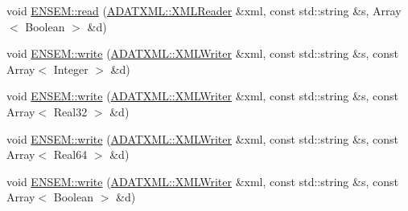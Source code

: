 \begin{DoxyCompactItemize}
\item 
void \mbox{\hyperlink{namespaceENSEM_a13be7bdc8993a65ff255f214db955c16}{E\+N\+S\+E\+M\+::read}} (\mbox{\hyperlink{classADATXML_1_1XMLReader}{A\+D\+A\+T\+X\+M\+L\+::\+X\+M\+L\+Reader}} \&xml, const std\+::string \&s, Array$<$ Boolean $>$ \&d)
\item 
void \mbox{\hyperlink{namespaceENSEM_a1e0e32b9a435ad75c6308eed3fbccdb9}{E\+N\+S\+E\+M\+::write}} (\mbox{\hyperlink{classADATXML_1_1XMLWriter}{A\+D\+A\+T\+X\+M\+L\+::\+X\+M\+L\+Writer}} \&xml, const std\+::string \&s, const Array$<$ Integer $>$ \&d)
\item 
void \mbox{\hyperlink{namespaceENSEM_a5d6d46f2975052a57ae6d284798b574a}{E\+N\+S\+E\+M\+::write}} (\mbox{\hyperlink{classADATXML_1_1XMLWriter}{A\+D\+A\+T\+X\+M\+L\+::\+X\+M\+L\+Writer}} \&xml, const std\+::string \&s, const Array$<$ Real32 $>$ \&d)
\item 
void \mbox{\hyperlink{namespaceENSEM_a3723b1ab200b48b7d24a4beee45aceef}{E\+N\+S\+E\+M\+::write}} (\mbox{\hyperlink{classADATXML_1_1XMLWriter}{A\+D\+A\+T\+X\+M\+L\+::\+X\+M\+L\+Writer}} \&xml, const std\+::string \&s, const Array$<$ Real64 $>$ \&d)
\item 
void \mbox{\hyperlink{namespaceENSEM_ac8d30a87c5709126729f9c0169804c2a}{E\+N\+S\+E\+M\+::write}} (\mbox{\hyperlink{classADATXML_1_1XMLWriter}{A\+D\+A\+T\+X\+M\+L\+::\+X\+M\+L\+Writer}} \&xml, const std\+::string \&s, const Array$<$ Boolean $>$ \&d)
\end{DoxyCompactItemize}
